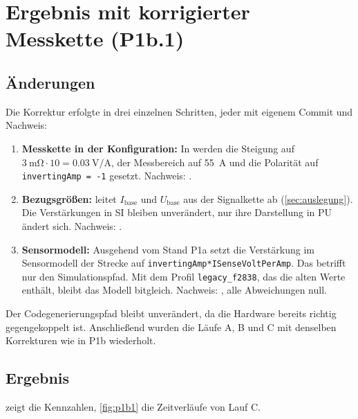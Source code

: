 \section{Ergebnis mit korrigierter Messkette (P1b.1)}
\label{sec:p1b1}

\subsection{Änderungen}

Die Korrektur erfolgte in drei einzelnen Schritten, jeder mit eigenem Commit und Nachweis:

\begin{enumerate}
  \item \textbf{Messkette in der Konfiguration:} In 
    werden die Steigung auf $\SI{3}{\milli\ohm} \cdot 10 = \SI{0,03}{\volt\per\ampere}$, der
    Messbereich auf \SI{55}{\ampere} und die Polarität auf \texttt{invertingAmp = -1} gesetzt.
    Nachweis: .
  \item \textbf{Bezugsgrößen:}  leitet $I_\mathrm{base}$ und
    $U_\mathrm{base}$ aus der Signalkette ab (\cref{sec:auslegung}). Die Verstärkungen in SI
    bleiben unverändert, nur ihre Darstellung in \ac{PU} ändert sich. Nachweis:
    .
  \item \textbf{Sensormodell:} Ausgehend vom Stand P1a setzt 
    die Verstärkung im Sensormodell der Strecke auf
    \texttt{invertingAmp*ISenseVoltPerAmp}. Das betrifft nur den Simulationspfad. Mit dem
    Profil \texttt{legacy\_f2838}, das die alten Werte enthält, bleibt das Modell bitgleich.
    Nachweis: , alle Abweichungen null.
\end{enumerate}

Der Codegenerierungspfad bleibt unverändert, da die Hardware bereits richtig gegengekoppelt
ist. Anschließend wurden die Läufe A, B und C mit denselben Korrekturen wie in P1b wiederholt.

\subsection{Ergebnis}

 zeigt die Kennzahlen, \cref{fig:p1b1} die Zeitverläufe von Lauf C.

